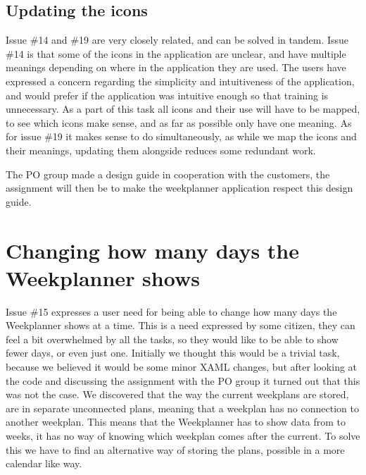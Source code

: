 \subsection{Updating the icons}
Issue \#14 and \#19 are very closely related, and can be solved in tandem. Issue \#14 is that some of the icons in the application are unclear, and have multiple meanings depending on where in the application they are used. The users have expressed a concern regarding the simplicity and intuitiveness of the application, and would prefer if the application was intuitive enough so that training is unnecessary.
As a part of this task all icons and their use will have to be mapped, to see which icons make sense, and as far as possible only have one meaning. As for issue \#19 it makes sense to do simultaneously, as while we map the icons and their meanings, updating them alongside reduces some redundant work. 

The \gls{PO} group made a design guide in cooperation with the customers, the assignment will then be to make the weekplanner application respect this design guide.

\section{Changing how many days the Weekplanner shows}\label{sec:weekPlannerDaysToShow}

Issue \#15 expresses a user need for being able to change how many days the Weekplanner shows at a time. This is a need expressed by some citizen, they can feel a bit overwhelmed by all the tasks, so they would like to be able to show fewer days, or even just one.
Initially we thought this would be a trivial task, because we believed it would be some minor \gls{XAML} changes, but after looking at the code and discussing the assignment with the \gls{PO} group it turned out that this was not the case. We discovered that the way the current weekplans are stored, are in separate unconnected plans, meaning that a weekplan has no connection to another weekplan. This means that the Weekplanner has to show data from to weeks, it has no way of knowing which weekplan comes after the current.
To solve this we have to find an alternative way of storing the plans, possible in a more calendar like way.


